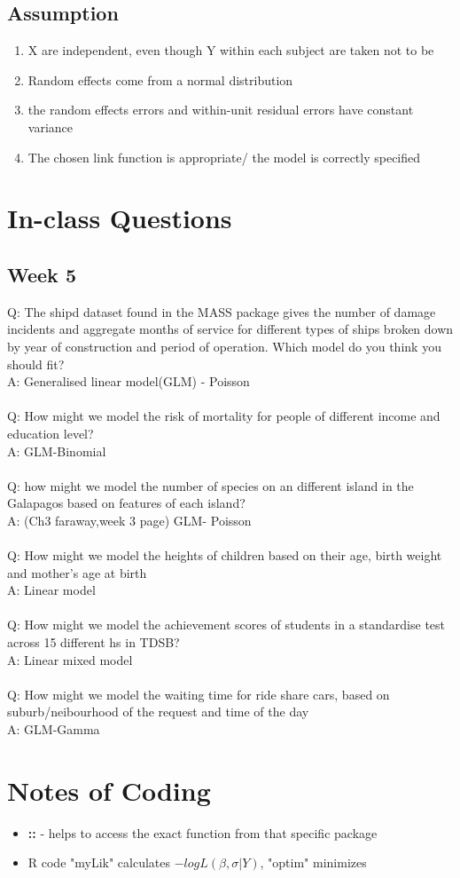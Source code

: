 \documentclass{article}
\theoremstyle{definition}
\theoremstyle{thrm}
\theoremstyle{lma}
\theoremstyle{ppst}
\theoremstyle{crlr}
\begin{document}
\subsection{Assumption}
\begin{enumerate}
	\item X are independent, even though Y within each subject are taken not to be
	\item Random effects come from a normal distribution
	\item the random effects errors and within-unit residual errors have constant variance 
	\item The chosen link function is appropriate/ the model is correctly specified 
\end{enumerate}



\pagebreak
\section{In-class Questions}
\subsection{Week 5}
Q: The shipd dataset found in the MASS package gives the number of damage incidents and aggregate months of service for different types of ships broken down by year of construction and period of operation. Which model do you think you should fit?\\
A: Generalised linear model(GLM) - Poisson\\
\\
Q: How might we model the risk of mortality for people of different income and education level?\\
A: GLM-Binomial\\
\\
Q: how might we model the number of species on an different island in the Galapagos based on features of each island?\\
A: (Ch3 faraway,week 3 page) GLM- Poisson \\
\\
Q: How might we model the heights of children based on their age, birth weight and mother's age at birth\\
A: Linear model\\
\\
Q: How might we model the achievement scores of students in a standardise test across 15 different hs in TDSB?\\
A: Linear mixed model\\
\\
Q: How might we model the waiting time for ride share cars, based on suburb/neibourhood of the request and time of the day\\
A: GLM-Gamma\\



\section{Notes of Coding}
\begin{itemize}
	\item \textbf{::} - helps to access the exact function from that specific package
	\item R code "myLik" calculates $-logL(\beta,\sigma|Y)$, "optim" minimizes
\end{itemize}
\end{document}
